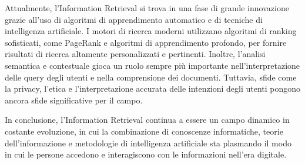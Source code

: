 Attualmente, l'Information Retrieval si trova in una fase di grande innovazione grazie all'uso di algoritmi di apprendimento automatico e di tecniche di intelligenza artificiale. I motori di ricerca moderni utilizzano algoritmi di ranking sofisticati, come PageRank e algoritmi di apprendimento profondo, per fornire risultati di ricerca altamente personalizzati e pertinenti. Inoltre, l'analisi semantica e contestuale gioca un ruolo sempre più importante nell'interpretazione delle query degli utenti e nella comprensione dei documenti. Tuttavia, sfide come la privacy, l'etica e l'interpretazione accurata delle intenzioni degli utenti pongono ancora sfide significative per il campo.

In conclusione, l'Information Retrieval continua a essere un campo dinamico in costante evoluzione, in cui la combinazione di conoscenze informatiche, teorie dell'informazione e metodologie di intelligenza artificiale sta plasmando il modo in cui le persone accedono e interagiscono con le informazioni nell'era digitale.